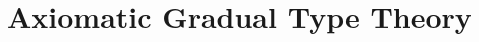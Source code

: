 \documentclass[acmsmall,nonacm]{acmart}
\newcommand{\cbpv}{CBPV}
\newcommand{\ltdyn}{\sqsubseteq}
\newcommand{\uarrow}{\mathrel{\rotatebox[origin=c]{-30}{$\leftarrowtail$}}}
\newcommand{\darrow}{\mathrel{\rotatebox[origin=c]{30}{$\twoheadleftarrow$}}}
\newcommand{\upcast}[2]{\langle{#2}\uarrow{#1}\rangle}
\newcommand{\dncast}[2]{\langle{#1}\darrow{#2}\rangle}
\newcommand{\err}{\mho}
\begin{document}



\section{Axiomatic Gradual Type Theory}
\label{sec:gtt}
\end{document}
